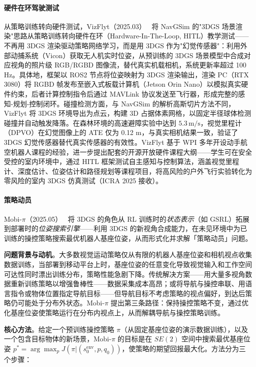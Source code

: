 \paragraph{硬件在环驾驶测试}

从策略训练转向硬件测试，VizFlyt（2025.03）~\cite{2503_22876} 将 NavGSim 的"3DGS 场景渲染"思路从策略训练转向硬件在环（Hardware-In-The-Loop, HITL）教学测试——不再用 3DGS 渲染驱动策略网络学习，而是用 3DGS 作为"幻觉传感器"：利用外部动捕系统（Vicon）获取无人机实时位姿，从预训练的 3DGS 场景模型中合成对应视角的照片级 RGB/RGBD 图像流，替代真实机载相机，系统更新率超过 100 Hz。具体地，框架以 ROS2 节点将位姿映射为 3DGS 渲染输出，渲染 PC（RTX 3080）将 RGBD 帧发布至嵌入式板载计算机（Jetson Orin Nano）以模拟真实硬件约束，后者计算控制指令后通过 MAVLink 协议发送至飞行器，形成完整的感知-规划-控制闭环。碰撞检测方面，与 NavGSim 的解析高斯切片方法不同，VizFlyt 将 3DGS 环境导出为点云，构建 3D 占据体素网格，以固定半径球体检测碰撞并自动触发降落。在森林环境的高速避障实验中达到 $5.3\,\text{m/s}$，视觉里程计（DPVO）在幻觉图像上的 ATE 仅为 0.12 m，与真实相机结果一致，验证了 3DGS 幻觉传感器替代真实传感器的有效性。VizFlyt 基于 WPI 多年开设动手航空机器人课程的经验，进一步提出配套的开源开放硬件课程大纲——学生可在安全受控的室内环境中，通过 HITL 框架测试自主感知与控制算法，涵盖视觉里程计、深度估计、位姿估计和路径规划等课程项目，将高风险的户外飞行实验转化为零风险的室内 3DGS 仿真测试（ICRA 2025 接收）。

\paragraph{策略动员}

Mobi-$\pi$（2025.05）~\cite{2505_23692} 将 3DGS 的角色从 RL 训练时的\textit{状态表示}（如 GSRL）拓展到部署时的\textit{位姿搜索引擎}——利用 3DGS 的新视角合成能力，在未见环境中为已训练的操控策略搜索最优机器人基座位姿，从而形式化并求解「策略动员」问题。

\textbf{问题背景与动机}。大多数视觉运动策略仅从有限的机器人基座位姿和相机视点收集数据训练，当部署到移动平台上时，基座位姿的任意变化导致视觉输入和工作空间可达性同时漂出训练分布，策略性能急剧下降。传统解决方案——用大量多视角数据重新训练策略以增强鲁棒性——数据采集成本高昂；或将导航与操控串联、用语言指令或物体位置指定导航目标——但导航目标不考虑策略的视点偏好，到达后策略仍可能处于分布外状态。Mobi-$\pi$ 提出第三条路径：保持操控策略不变，通过优化基座位姿使策略运行在分布内视点上，从而解耦导航与操控策略训练。

\textbf{核心方法}。给定一个预训练操控策略 $\pi$（从固定基座位姿的演示数据训练），以及一个包含目标物体的新场景，Mobi-$\pi$ 的目标是在 $SE(2)$ 空间中搜索最优基座位姿 $p^{*} = \arg\max_{p} J(\pi | (s^{\text{env}}_0, p, q_0))$，使策略的期望回报最大化。方法分为三个步骤：


